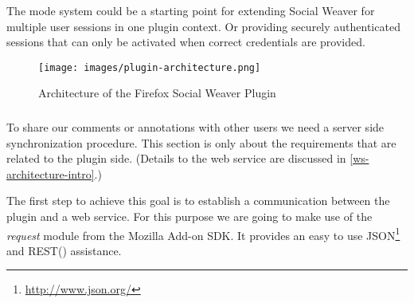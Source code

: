 The mode system could be a starting point for extending Social Weaver for multiple user sessions in one plugin context. Or providing securely authenticated sessions that can only be activated when correct credentials are provided. 

\begin{figure}\centering
		\texttt{[image: images/plugin-architecture.png]}
		\caption{Architecture of the Firefox Social Weaver Plugin}
		\label{plugin-architecture}
\end{figure} 

\subsubsection[Communication]{\reqPiii}
To share our comments or annotations with other users we need a server side synchronization procedure. This section is only about the requirements that are related to the plugin side. (Details to the web service are discussed in  \ref{ws-architecture-intro}.)

The first step to achieve this goal is to establish a communication between the plugin and a web service. For this purpose we are going to make use of the \emph{request} module from the Mozilla Add-on SDK. It provides an easy to use JSON\footnote{\url{http://www.json.org/}} and REST(\cite{fielding2000principled}) assistance. 

